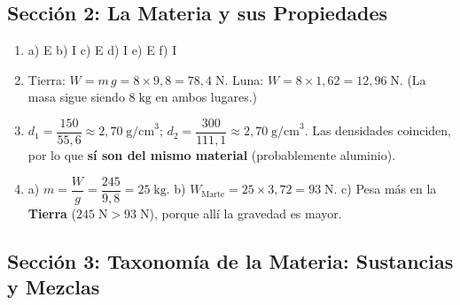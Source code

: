 \documentclass[12pt, letterpaper]{article}
\begin{document}
  \newpage

  \subsection*{Sección 2: La Materia y sus Propiedades}

  \begin{enumerate}[leftmargin=*, label=\textbf{\arabic*.}]
    \item a) E \quad b) I \quad c) E \quad d) I \quad e) E \quad f) I

    \item Tierra: $W = m\,g = 8 \times 9{,}8 = 78{,}4\;\text{N}$. \quad Luna: $W = 8 \times 1{,}62 = 12{,}96\;\text{N}$.
          (La masa sigue siendo $8\;\text{kg}$ en ambos lugares.)

    \item $d_1 = \dfrac{150}{55{,}6} \approx 2{,}70\;\text{g/cm}^3$; \quad $d_2 = \dfrac{300}{111{,}1} \approx 2{,}70\;\text{g/cm}^3$.
          Las densidades coinciden, por lo que \textbf{sí son del mismo material} (probablemente aluminio).

    \item a) $m = \dfrac{W}{g} = \dfrac{245}{9{,}8} = 25\;\text{kg}$.
          \quad b) $W_{\text{Marte}} = 25 \times 3{,}72 = 93\;\text{N}$.
          \quad c) Pesa más en la \textbf{Tierra} ($245\;\text{N} > 93\;\text{N}$), porque allí la gravedad es mayor.
  \end{enumerate}

  \newpage

  \subsection*{Sección 3: Taxonomía de la Materia: Sustancias y Mezclas}
\end{document}
